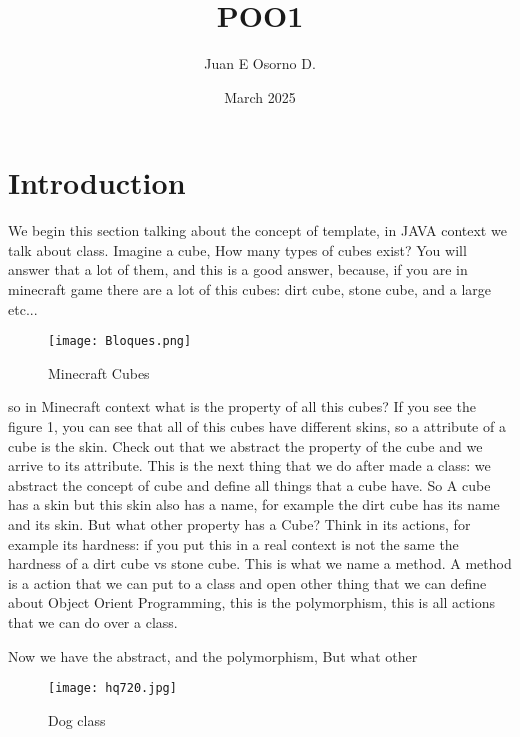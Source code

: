 \documentclass{article}
\title{POO1}
\author{Juan E Osorno D.}
\date{March 2025}
\begin{document}
\maketitle

\section{Introduction}

We begin this section talking about the concept of template, in JAVA context we talk about class. Imagine a cube,
How many types of cubes exist? You will answer that a lot of them, and this is a good answer, because, if you are 
in minecraft game there are a lot of this cubes: dirt cube, stone cube, and a large etc... 

\begin{figure}[h!]
    \centering
    \texttt{[image: Bloques.png]}
    \caption{Minecraft Cubes}
    \label{fig:etiqueta}
\end{figure}

so in Minecraft context what is the property of all this cubes? If you see the figure 1, you can see that all of this cubes have different skins, so a attribute of a cube is the skin. Check out that we abstract the property of the cube and we arrive to its attribute. This is the next thing that we do after made a class: we abstract the concept of cube and define all things that a cube have. So A cube has a skin but this skin also has a name, for example the dirt cube has its name  and its skin. But what other property has a Cube? Think in its actions, for example its hardness: if you put this in a real context is not the same the hardness of a dirt cube vs stone cube. This is what we name a method. A method is a action that we can put to a class and open other thing that we can define about Object Orient Programming, this is the 
polymorphism, this is all actions that we can do over a class. 

Now we have the abstract, and the polymorphism, But what other 

\begin{figure}[h!]
    \centering
    \texttt{[image: hq720.jpg]}
    \caption{Dog class}
    \label{fig:etiqueta}
\end{figure}
\end{document}

